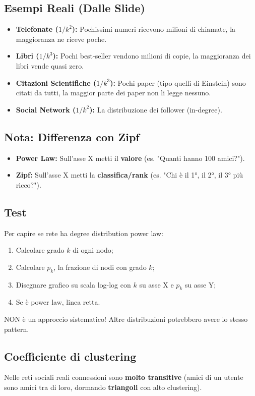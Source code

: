 \documentclass{article}
\begin{document}
  \subsection{Esempi Reali (Dalle Slide)}
    \begin{itemize}
        \item \textbf{Telefonate ($1/k^2$):} Pochissimi numeri ricevono milioni di chiamate, la maggioranza ne riceve poche.
        \item \textbf{Libri ($1/k^3$):} Pochi best-seller vendono milioni di copie, la maggioranza dei libri vende quasi zero.
        \item \textbf{Citazioni Scientifiche ($1/k^3$):} Pochi paper (tipo quelli di Einstein) sono citati da tutti, la maggior parte dei paper non li legge nessuno.
        \item \textbf{Social Network ($1/k^2$):} La distribuzione dei follower (in-degree).
    \end{itemize}
  \subsection{Nota: Differenza con Zipf}
    \begin{itemize}
        \item \textbf{Power Law:} Sull'asse X metti il \textbf{valore} (es. "Quanti hanno 100 amici?").
        \item \textbf{Zipf:} Sull'asse X metti la \textbf{classifica/rank} (es. "Chi è il 1°, il 2°, il 3° più ricco?").
    \end{itemize}
  \subsection{Test}
    Per capire se rete ha degree distribution power law:
    \begin{enumerate}
        \item Calcolare grado $k$ di ogni nodo;
        \item Calcolare $p_k$, la frazione di nodi con grado $k$;
        \item Disegnare grafico su scala log-log con $k$ su asse X e $p_k$ su asse Y;
        \item Se è power law, linea retta.
    \end{enumerate}
    NON è un approccio sistematico! Altre distribuzioni potrebbero avere lo stesso pattern.
  \subsection{Coefficiente di clustering}
    Nelle reti sociali reali connessioni sono \textbf{molto transitive} (amici di un utente sono amici tra di loro, dormando \textbf{triangoli} con alto clustering).
\end{document}
